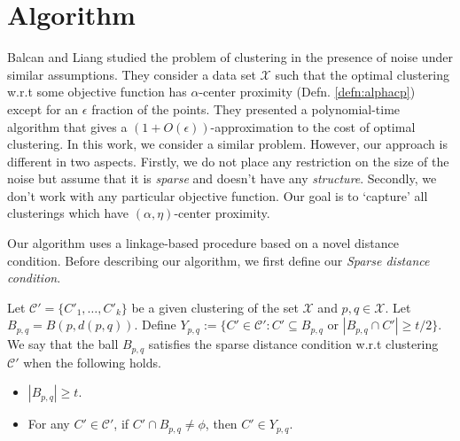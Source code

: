 \documentclass[11pt]{article}
\newcommand{\mc}{\mathcal}
\begin{document}
\section{Algorithm}
Balcan and Liang studied the problem of clustering in the presence of noise under similar assumptions. They consider a data set $\mc X$ such that the optimal clustering w.r.t some objective function has $\alpha$-center proximity (Defn. \ref{defn:alphacp}) except for an $\epsilon$ fraction of the points. They presented a polynomial-time algorithm that gives a $(1+O(\epsilon))$-approximation to the cost of optimal clustering. %
In this work, we consider a similar problem. However, our approach is different in two aspects. Firstly, we do not place any restriction on the size of the noise but assume that it is {\it sparse} and doesn't have any {\it structure}. Secondly, we don't work with any particular objective function. Our goal is to `capture' all clusterings which have $(\alpha, \eta)$-center proximity.

Our algorithm uses a linkage-based procedure based on a novel distance condition. Before describing our algorithm, we first define our {\it Sparse distance condition}.

\begin{definition}
	 Let $\mc C'=\{C'_1,\ldots,C'_k\}$ be a given clustering of the set $\mc X$ and $p, q \in \mc X$. Let $B_{p,q} = B(p, d(p, q))$. Define $Y_{p,q} := \{C' \in \mc C' : C' \subseteq B_{p,q} \text{ or } |B_{p,q} \cap C'| \ge t/2\}$. 
We say that the ball $B_{p,q}$ satisfies the sparse distance condition w.r.t clustering $\mc C'$ when the following holds.
\begin{itemize}[noitemsep, leftmargin=*]
\item $|B_{p,q}| \ge t$.
\item For any $C' \in \mc C'$, if $C' \cap B_{p,q} \neq \phi$, then $C' \in Y_{p,q}$.
\end{itemize}
\end{definition}
\end{document}
